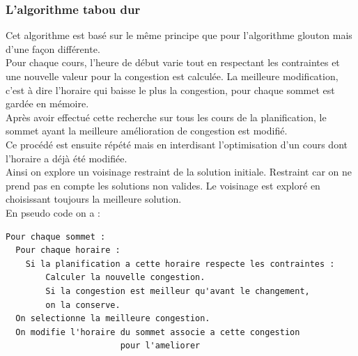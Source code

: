 \documentclass[a4paper,11pt]{article}
\begin{document}
		\subsubsection{L'algorithme tabou dur}
			Cet algorithme est basé sur le même principe que pour l'algorithme glouton mais d'une façon différente.\\
			Pour chaque cours, l'heure de début varie tout en respectant les contraintes et une nouvelle valeur pour la congestion est calculée. La meilleure modification, c'est à dire l'horaire qui baisse le plus la congestion, pour chaque sommet est gardée en mémoire.\\
			Après avoir effectué cette recherche sur tous les cours de la planification, le sommet ayant la meilleure amélioration de congestion est modifié.\\
			Ce procédé est ensuite répété mais en interdisant l'optimisation d'un cours dont l'horaire a déjà été modifiée.\\
			Ainsi on explore un voisinage restraint de la solution initiale. Restraint car on ne prend pas en compte les solutions non valides. Le voisinage est exploré en choisissant toujours la meilleure solution.\\
			En pseudo code on a :\\
\begin{lstlisting}
Pour chaque sommet :
  Pour chaque horaire :
  	Si la planification a cette horaire respecte les contraintes :
    	Calculer la nouvelle congestion.
    	Si la congestion est meilleur qu'avant le changement,
      	on la conserve.
  On selectionne la meilleure congestion. 
  On modifie l'horaire du sommet associe a cette congestion 
  					   pour l'ameliorer
		\end{lstlisting}
\end{document}

